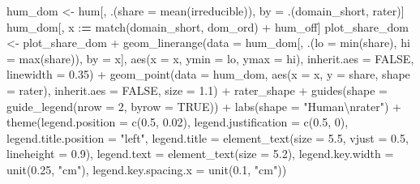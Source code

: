 \documentclass[
  11pt,
]{article}
\newenvironment{Shaded}{\begin{snugshade}}{\end{snugshade}}
\newcommand{\AttributeTok}[1]{\textcolor[rgb]{0.77,0.63,0.00}{#1}}
\newcommand{\ConstantTok}[1]{\textcolor[rgb]{0.00,0.00,0.00}{#1}}
\newcommand{\DecValTok}[1]{\textcolor[rgb]{0.00,0.00,0.81}{#1}}
\newcommand{\ErrorTok}[1]{\textcolor[rgb]{0.64,0.00,0.00}{\textbf{#1}}}
\newcommand{\FloatTok}[1]{\textcolor[rgb]{0.00,0.00,0.81}{#1}}
\newcommand{\FunctionTok}[1]{\textcolor[rgb]{0.00,0.00,0.00}{#1}}
\newcommand{\NormalTok}[1]{#1}
\newcommand{\OtherTok}[1]{\textcolor[rgb]{0.56,0.35,0.01}{#1}}
\newcommand{\SpecialCharTok}[1]{\textcolor[rgb]{0.00,0.00,0.00}{#1}}
\newcommand{\StringTok}[1]{\textcolor[rgb]{0.31,0.60,0.02}{#1}}
\begin{document}
\begin{Shaded}
\begin{Highlighting}[]
\NormalTok{hum\_dom }\OtherTok{\textless{}{-}}\NormalTok{ hum[, .(}\AttributeTok{share =} \FunctionTok{mean}\NormalTok{(irreducible)), by }\OtherTok{=}\NormalTok{ .(domain\_short, rater)]}
\NormalTok{hum\_dom[, x }\SpecialCharTok{:}\ErrorTok{=} \FunctionTok{match}\NormalTok{(domain\_short, dom\_ord) }\SpecialCharTok{+}\NormalTok{ hum\_off]}
\NormalTok{plot\_share\_dom }\OtherTok{\textless{}{-}}\NormalTok{ plot\_share\_dom }\SpecialCharTok{+}
  \FunctionTok{geom\_linerange}\NormalTok{(}\AttributeTok{data =}\NormalTok{ hum\_dom[, .(}\AttributeTok{lo =} \FunctionTok{min}\NormalTok{(share), }\AttributeTok{hi =} \FunctionTok{max}\NormalTok{(share)), }\AttributeTok{by =}\NormalTok{ x],}
                 \FunctionTok{aes}\NormalTok{(}\AttributeTok{x =}\NormalTok{ x, }\AttributeTok{ymin =}\NormalTok{ lo, }\AttributeTok{ymax =}\NormalTok{ hi), }\AttributeTok{inherit.aes =} \ConstantTok{FALSE}\NormalTok{,}
                 \AttributeTok{linewidth =} \FloatTok{0.35}\NormalTok{) }\SpecialCharTok{+}
  \FunctionTok{geom\_point}\NormalTok{(}\AttributeTok{data =}\NormalTok{ hum\_dom, }\FunctionTok{aes}\NormalTok{(}\AttributeTok{x =}\NormalTok{ x, }\AttributeTok{y =}\NormalTok{ share, }\AttributeTok{shape =}\NormalTok{ rater),}
             \AttributeTok{inherit.aes =} \ConstantTok{FALSE}\NormalTok{, }\AttributeTok{size =} \FloatTok{1.1}\NormalTok{) }\SpecialCharTok{+}
\NormalTok{  rater\_shape }\SpecialCharTok{+}
  \FunctionTok{guides}\NormalTok{(}\AttributeTok{shape =} \FunctionTok{guide\_legend}\NormalTok{(}\AttributeTok{nrow =} \DecValTok{2}\NormalTok{, }\AttributeTok{byrow =} \ConstantTok{TRUE}\NormalTok{)) }\SpecialCharTok{+}
  \FunctionTok{labs}\NormalTok{(}\AttributeTok{shape =} \StringTok{"Human}\SpecialCharTok{\textbackslash{}n}\StringTok{rater"}\NormalTok{) }\SpecialCharTok{+}
  \FunctionTok{theme}\NormalTok{(}\AttributeTok{legend.position =} \FunctionTok{c}\NormalTok{(}\FloatTok{0.5}\NormalTok{, }\FloatTok{0.02}\NormalTok{), }\AttributeTok{legend.justification =} \FunctionTok{c}\NormalTok{(}\FloatTok{0.5}\NormalTok{, }\DecValTok{0}\NormalTok{),}
        \AttributeTok{legend.title.position =} \StringTok{"left"}\NormalTok{,}
        \AttributeTok{legend.title =} \FunctionTok{element\_text}\NormalTok{(}\AttributeTok{size =} \FloatTok{5.5}\NormalTok{, }\AttributeTok{vjust =} \FloatTok{0.5}\NormalTok{, }\AttributeTok{lineheight =} \FloatTok{0.9}\NormalTok{),}
        \AttributeTok{legend.text =} \FunctionTok{element\_text}\NormalTok{(}\AttributeTok{size =} \FloatTok{5.2}\NormalTok{),}
        \AttributeTok{legend.key.width =} \FunctionTok{unit}\NormalTok{(}\FloatTok{0.25}\NormalTok{, }\StringTok{"cm"}\NormalTok{),}
        \AttributeTok{legend.key.spacing.x =} \FunctionTok{unit}\NormalTok{(}\FloatTok{0.1}\NormalTok{, }\StringTok{"cm"}\NormalTok{))}


\end{Highlighting}
\end{Shaded}
\end{document}
